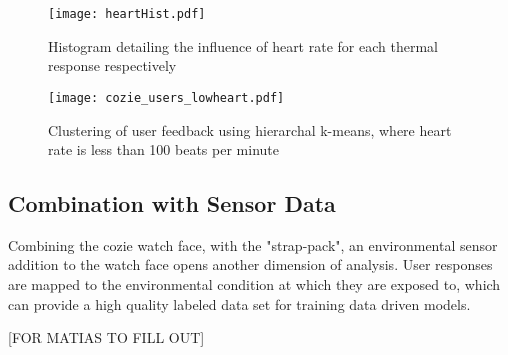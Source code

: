 \begin{figure}
\begin{center}
\texttt{[image: heartHist.pdf]}
\caption{Histogram detailing the influence of heart rate for each thermal response respectively}
\label{fig:heartHist}
\end{center}
\end{figure}

\begin{figure}
\begin{center}
\texttt{[image: cozie\_users\_lowheart.pdf]}
\caption{Clustering of user feedback using hierarchal k-means, where heart rate is less than 100 beats per minute}
\label{fig:lowHeartUsers}
\end{center}
\end{figure}

\subsection{Combination with Sensor Data}

Combining the cozie watch face, with the "strap-pack", an environmental sensor addition to the watch face opens another dimension of analysis. User responses are mapped to the environmental condition at which they are exposed to, which can provide a high quality labeled data set for training data driven models. 

[FOR MATIAS TO FILL OUT]